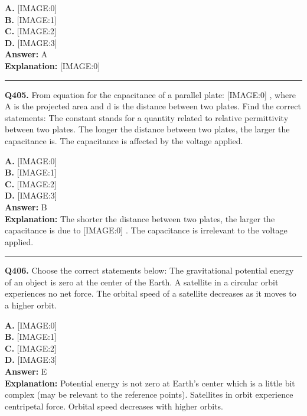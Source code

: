 \documentclass[12pt]{article}
\begin{document}
\textbf{A.} [IMAGE:0] \\
\textbf{B.} [IMAGE:1] \\
\textbf{C.} [IMAGE:2] \\
\textbf{D.} [IMAGE:3] \\

\textbf{Answer:} A \\
\textbf{Explanation:} [IMAGE:0]

\hrule
\vspace{1em}


\noindent
\textbf{Q405.} From equation for the capacitance of a parallel plate:
[IMAGE:0]
, where A is the projected area and d is the distance between two plates. Find the correct statements:
The constant stands for a quantity related to relative permittivity between two plates.
The longer the distance between two plates, the larger the capacitance is.
The capacitance is affected by the voltage applied.



\textbf{A.} [IMAGE:0] \\
\textbf{B.} [IMAGE:1] \\
\textbf{C.} [IMAGE:2] \\
\textbf{D.} [IMAGE:3] \\

\textbf{Answer:} B \\
\textbf{Explanation:} The shorter the distance between two plates, the larger the capacitance is due to
[IMAGE:0]
.
The capacitance is irrelevant to the voltage applied.

\hrule
\vspace{1em}


\noindent
\textbf{Q406.} Choose the correct statements below:
The gravitational potential energy of an object is zero at the center of the Earth.
A satellite in a circular orbit experiences no net force.
The orbital speed of a satellite decreases as it moves to a higher orbit.



\textbf{A.} [IMAGE:0] \\
\textbf{B.} [IMAGE:1] \\
\textbf{C.} [IMAGE:2] \\
\textbf{D.} [IMAGE:3] \\

\textbf{Answer:} E \\
\textbf{Explanation:} Potential energy is not zero at Earth's center which is a little bit complex (may be relevant to the reference points). Satellites in orbit experience centripetal force. Orbital speed decreases with higher orbits.
\end{document}
